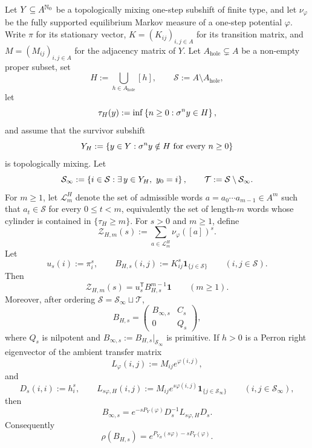 \begin{lemma}
\label{lem:survivor-renyi-matrix}
Let \(Y\subseteq A^{\mathbb{N}_0}\) be a topologically mixing one-step
subshift of finite type, and let \(\nu_\varphi\) be the fully supported
equilibrium Markov measure of a one-step potential \(\varphi\).  Write
\(\pi\) for its stationary vector, \(K=(K_{ij})_{i,j\in A}\) for its
transition matrix, and \(M=(M_{ij})_{i,j\in A}\) for the adjacency
matrix of \(Y\).  Let \(A_{\mathrm{hole}}\subsetneq A\) be a non-empty
proper subset, set
\[
  H:=\bigcup_{h\in A_{\mathrm{hole}}}[h],
  \qquad
  \mathcal S:=A\setminus A_{\mathrm{hole}},
\]
let
\[
  \tau_H(y):=\inf\left\{n\geq0:\sigma^n y\in H\right\},
\]
and assume that the survivor subshift
\[
  Y_H:=\left\{y\in Y:\sigma^n y\notin H\text{ for every }n\geq0\right\}
\]
is topologically mixing.  Let
\[
  \mathcal S_\infty
  :=\left\{i\in\mathcal S:\exists\,y\in Y_H,\ y_0=i\right\},
  \qquad
  \mathcal T:=\mathcal S\setminus\mathcal S_\infty.
\]
For \(m\geq1\), let \(\mathcal L_m^H\) denote the set of admissible words
\(a=a_0\cdots a_{m-1}\in A^m\) such that \(a_t\in\mathcal S\) for every
\(0\leq t<m\), equivalently the set of length-\(m\) words whose cylinder
is contained in \(\{\tau_H\geq m\}\).  For \(s>0\) and \(m\geq 1\),
define
\[
  \mathcal Z_{H,m}(s)
  := \sum_{a\in\mathcal L_m^H}\nu_\varphi([a])^s.
\]
Let
\[
  u_s(i):=\pi_i^s,
  \qquad
  B_{H,s}(i,j):=K_{ij}^s\mathbf 1_{\{j\in\mathcal S\}}
  \qquad (i,j\in\mathcal S).
\]
Then
\[
  \mathcal Z_{H,m}(s)=u_s^{\mathsf T}B_{H,s}^{m-1}\mathbf 1
  \qquad (m\geq 1).
\]
Moreover,
after ordering \(\mathcal S=\mathcal S_\infty\sqcup\mathcal T\),
\[
  B_{H,s}=
  \begin{pmatrix}
    B_{\infty,s} & C_s\\
    0 & Q_s
  \end{pmatrix},
\]
where \(Q_s\) is nilpotent and
\(B_{\infty,s}:=B_{H,s}|_{\mathcal S_\infty}\) is primitive.  If \(h>0\)
is a Perron right eigenvector of the ambient transfer matrix
\[
  L_\varphi(i,j):=M_{ij}e^{\varphi(i,j)},
\]
and
\[
  D_s(i,i):=h_i^s,
  \qquad
  L_{s\varphi,H}(i,j)
  := M_{ij}e^{s\varphi(i,j)}\mathbf 1_{\{j\in\mathcal S_\infty\}}
  \qquad (i,j\in\mathcal S_\infty),
\]
then
\[
  B_{\infty,s}
  = e^{-sP_Y(\varphi)}D_s^{-1}L_{s\varphi,H}D_s.
\]
Consequently
\[
  \rho(B_{H,s})
  = e^{P_{Y_H}(s\varphi)-sP_Y(\varphi)}.
\]
\end{lemma}

